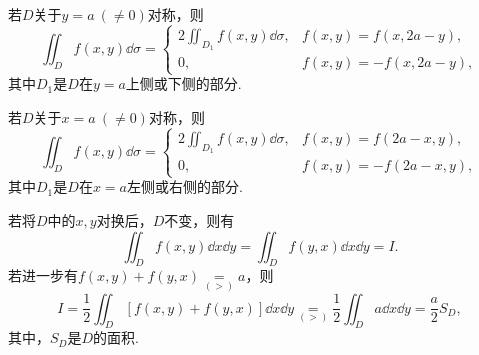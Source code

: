 若\(D\)关于\(y=a\ (\neq0)\)对称，则\[
	\iint_D f(x,y) \dd{\sigma}
	= \left\{ \begin{array}{cc}
		2 \iint_{D_1} f(x,y) \dd{\sigma}, & f(x,y) = f(x,2a-y), \\
		0, & f(x,y) = -f(x,2a-y),
	\end{array} \right.
\]
其中\(D_1\)是\(D\)在\(y=a\)上侧或下侧的部分.

若\(D\)关于\(x=a\ (\neq0)\)对称，则\[
	\iint_D f(x,y) \dd{\sigma}
	= \left\{ \begin{array}{cc}
		2 \iint_{D_1} f(x,y) \dd{\sigma}, & f(x,y) = f(2a-x,y), \\
		0, & f(x,y) = -f(2a-x,y),
	\end{array} \right.
\]
其中\(D_1\)是\(D\)在\(x=a\)左侧或右侧的部分.

\def\op{\underset{(>)}{=}}
若将\(D\)中的\(x,y\)对换后，\(D\)不变，则有\[
	\iint_D f(x,y) \dd{x}\dd{y} = \iint_D f(y,x) \dd{x}\dd{y} = I.
\]
若进一步有\(f(x,y)+f(y,x) \op a\)，则\[
	I = \frac{1}{2} \iint_D [ f(x,y) + f(y,x) ] \dd{x}\dd{y}
	\op \frac{1}{2} \iint_D a \dd{x}\dd{y}
	= \frac{a}{2} S_D,
\]
其中，\(S_D\)是\(D\)的面积.
\endgroup

